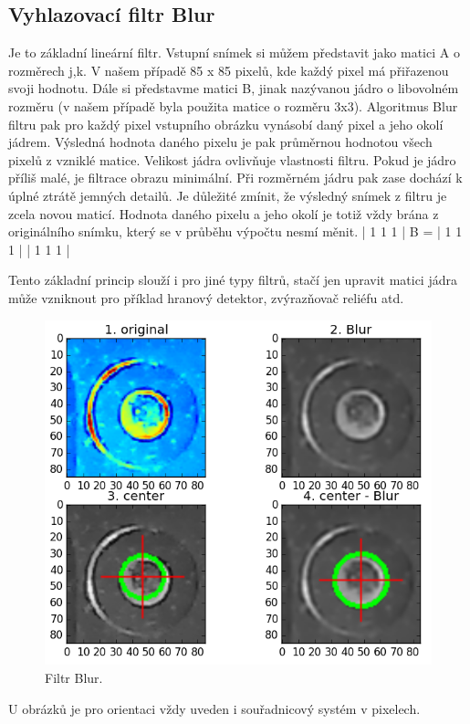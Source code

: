 \subsection{Vyhlazovací filtr Blur}

Je to základní lineární filtr. Vstupní snímek si můžem představit jako matici A o rozměrech j,k. V našem případě 85 x 85 pixelů, kde každý pixel má přiřazenou svoji hodnotu. Dále si představme matici B, jinak nazývanou jádro o libovolném rozměru (v našem případě byla použita matice o rozměru 3x3). Algoritmus Blur filtru pak pro každý pixel vstupního obrázku vynásobí daný pixel a jeho okolí jádrem. Výsledná hodnota daného pixelu je pak průměrnou hodnotou všech pixelů z vzniklé matice. Velikost jádra ovlivňuje vlastnosti filtru. Pokud je jádro příliš malé, je filtrace obrazu minimální. Při rozměrném jádru pak zase dochází k úplné ztrátě jemných detailů.
Je důležité zmínit, že výsledný snímek z filtru je zcela novou maticí. Hodnota daného pixelu a jeho okolí je totiž vždy brána z originálního snímku, který se v průběhu výpočtu nesmí měnit.
       | 1 1 1 |
B = | 1 1 1 |
       | 1 1 1 |

Tento základní princip slouží i pro jiné typy filtrů, stačí jen upravit matici jádra může vzniknout pro příklad hranový detektor, zvýrazňovač reliéfu atd.

\begin{figure}[H]
  \centering
    \includegraphics[width=0.8\linewidth]{obrazky/blur.png}%
    \caption{Filtr Blur.}
    \label{fig:blur}
\end{figure}

U obrázků je pro orientaci vždy uveden i souřadnicový systém v pixelech.


